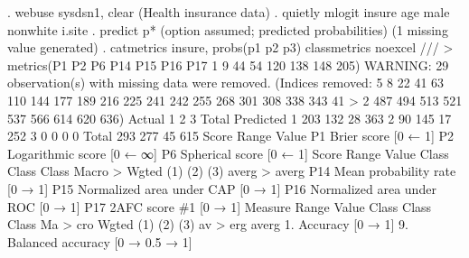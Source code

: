 . webuse sysdsn1, clear
(Health insurance data)
{\smallskip}
. quietly mlogit insure age male nonwhite i.site
{\smallskip}
. predict p*
(option {} assumed; predicted probabilities)
(1 missing value generated)
{\smallskip}
. catmetrics insure, probs(p1 p2 p3) classmetrics noexcel ///
> metrics(P1 P2 P6 P14 P15 P16 P17 1 9 44 54 120 138 148 205)
WARNING: 29 observation(s) with missing data were removed.
(Indices removed: 5 8 22 41 63 110 144 177 189 216 225 241 242 255 268 301 308 338 343 41
> 2 487 494 513 521 537 566 614 620 636)
{\smallskip}
{}
{\smallskip}
    Actual {\VBAR}      1      2      3 {\VBAR}    Total 
 Predicted {\VBAR}                      {\VBAR}
         1 {\VBAR}    203    132     28 {\VBAR}      363 
         2 {\VBAR}     90    145     17 {\VBAR}      252 
         3 {\VBAR}      0      0      0 {\VBAR}        0 
     Total {\VBAR}    293    277     45 {\VBAR}      615 
{\smallskip}
{}
Score                    Range           Value
P1 Brier score          [0 ← 1]    {}
P2 Logarithmic score    [0 ← ∞]    {}
P6 Spherical score      [0 ← 1]    {}
{\smallskip}
{}
Score                             Range        Value    Class    Class    Class    Macro 
>    Wgted
                                                          (1)      (2)      (3)    averg 
>    averg
P14 Mean probability rate        [0 → 1]     {}
P15 Normalized area under CAP    [0 → 1]     {\bftt{       }} {} {} {} {} 
{}
P16 Normalized area under ROC    [0 → 1]     {\bftt{       }} {} {} {} {} 
{}
P17 2AFC score \#1                [0 → 1]     {}
{\smallskip}
{}
Measure                                 Range     Value    Class    Class    Class     Ma
> cro     Wgted
                                                             (1)      (2)      (3)     av
> erg     averg
1. Accuracy                           [0 → 1]  {}
{\bftt{>              }}
9. Balanced accuracy            [0 → 0.5 → 1]  {}
